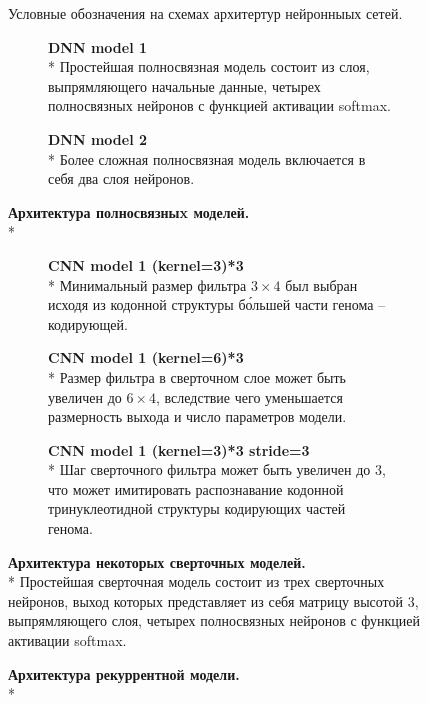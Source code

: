 \begin{figure}[h] %
	\centering
	
	\caption{Условные обозначения на схемах архитертур нейронныых сетей.}
	\label{fig:legend}	
\end{figure}

\begin{figure*}[h] %
	\centering
	\begin{subfigure}[t]{0.55\linewidth}
		
		\caption{{\bfseries DNN model 1} \\*
		Простейшая полносвязная модель состоит из слоя, выпрямляющего начальные данные, четырех полносвязных нейронов с функцией активации softmax.}
		\label{fig:dnn_1_scheme}
	\end{subfigure}
	\begin{subfigure}[t]{0.40\linewidth}
				
		\caption{{\bfseries DNN model 2} \\*
		Более сложная полносвязная модель включается в себя два слоя нейронов.
		}
		\label{fig:dnn_2_scheme}
	\end{subfigure}
	\caption{{\bfseries Архитектура полносвязныx моделей.} \\*}
	
	\label{fig:dnn_scheme}
	
\end{figure*}

\begin{figure*}[h] %
	\centering
	\begin{subfigure}[t]{0.3\linewidth}
		
		\caption{{\bfseries CNN model 1 (kernel=3)*3} \\*
		Минимальный размер фильтра $3\times4$ был выбран исходя из кодонной структуры б\'{о}льшей части генома -- кодирующей.}
		\label{fig:cnn_1_scheme}
	\end{subfigure}
	\begin{subfigure}[t]{0.3\linewidth}
				
		\caption{{\bfseries CNN model 1 (kernel=6)*3} \\*
		Размер фильтра в сверточном слое может быть увеличен до $6\times4$, вследствие чего уменьшается размерность выхода и число параметров модели.
		}
		\label{fig:cnn_2_scheme}
	\end{subfigure}
	\begin{subfigure}[t]{0.3\linewidth}
				
		\caption{{\bfseries CNN model 1 (kernel=3)*3 stride=3} \\* 
		Шаг сверточного фильтра может быть увеличен до 3, что может имитировать распознавание кодонной тринуклеотидной структуры кодирующих частей генома.
		}
		\label{fig:cnn_3_scheme}
	\end{subfigure}
	\caption{{\bfseries Архитектура некоторых сверточных моделей.} \\*  Простейшая сверточная модель состоит из трех сверточных нейронов, выход которых представляет из себя матрицу высотой 3, выпрямляющего слоя, четырех полносвязных нейронов с функцией активации softmax.}

	
	\label{fig:cnn_schemes}	
\end{figure*}

\begin{figure}[h] %
	\centering
	
	\caption{{\bfseries Архитектура рекуррентной модели.} \\* }
	\label{fig:rnn_scheme}	
\end{figure}
